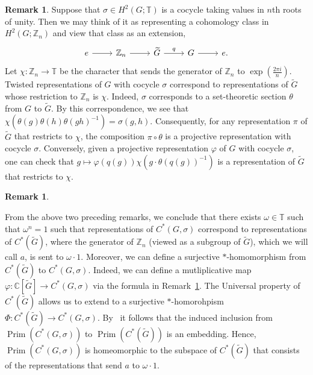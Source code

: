 \documentclass{amsart}
\theoremstyle{definition}
\newtheorem{remark}[theorem]{Remark}
\newcommand{\C}{\mathbb{C}}
\newcommand{\Z}{\mathbb{Z}}
\newcommand{\TT}{\mathbb{T}}
\DeclareMathOperator{\Prim}{Prim}
\begin{document}
\begin{remark}\label{reps_of_central_extension}
Suppose that $\sigma\in H^2(G;\TT)$ is a cocycle taking values in $n$th roots of unity. 
Then we may think of it as representing a cohomology class in $H^2(G;\Z_n)$ and view that class as an extension,
$$\begin{tikzcd}
e\arrow{r}&\Z_n\arrow{r}&\widetilde{G}\arrow{r}{q}&G\arrow{r}&e.
\end{tikzcd}$$
Let $\chi\colon \Z_n\rightarrow \TT$ be the character that sends the generator of $\Z_n$ to $\exp(\frac{2\pi i}{n})$.
Twisted representations of $G$ with cocycle $\sigma$ correspond to representations of $\widetilde{G}$ whose restriction to $\Z_n$ is $\chi$. Indeed, $\sigma$ corresponds to a set-theoretic section $\theta$ from $G$ to $\widetilde{G}$. By this correspondence, we see that $\chi(\theta(g)\theta(h)\theta(gh)^{-1})=\sigma(g,h)$.
Consequently, for any representation $\pi$ of $\widetilde{G}$ that restricts to $\chi$, the composition $\pi\circ\theta$ is a projective representation with cocycle $\sigma$. Conversely, given a projective representation $\varphi$ of $G$ with cocycle $\sigma$, one can check that
$g\mapsto \varphi(q(g))\chi(g\cdot\theta(q(g))^{-1})$ is a representation of $\widetilde{G}$ that restricts to $\chi$. 
\end{remark}
\begin{remark}\label{correspondence}

From the above two preceding remarks, we conclude that there exists $\omega\in \TT$ such that $\omega^n=1$ such that representations of $C^*(G,\sigma)$ correspond to representations of $C^*(\widetilde{G})$, where the generator of $\Z_n$ (viewed as a subgroup of $\widetilde{G}$), which we will call $a$, is sent to $\omega\cdot1$. Moreover, we can define a surjective $*$-homomorphism from $C^*(\widetilde{G})$ to $C^*(G,\sigma)$. Indeed, we can define a mutliplicative map $\varphi\colon\C[\widetilde{G}]\to C^*(G,\sigma)$ via the formula in Remark~\ref{reps_of_central_extension}. The Universal property of $C^*(\widetilde{G})$ allows us to extend to a surjective $*$-homorohpism $\Phi\colon C^*(\widetilde{G})\rightarrow C^*(G,\sigma)$. By~\cite[Theorem 5.5.7]{murph} it follows that the induced inclusion from $\Prim(C^*(G,\sigma))$ to $\Prim(C^*(\widetilde{G}))$ is an embedding. Hence, $\Prim(C^*(G,\sigma))$ is homeomorphic to the subspace of $C^*(\widetilde{G})$ that consists of the representations that send $a$ to $\omega\cdot1$.
\end{remark}
\end{document}
